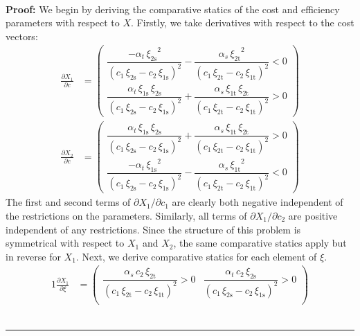 \documentclass[11pt,a4paper]{extarticle}
\newenvironment{proof}[1][Proof]{\noindent\textbf{#1:} }{\ \rule{0.5em}{0.5em}}
\begin{document}
\hfill \\
\begin{proof}
	We begin by deriving the comparative statics of the cost and efficiency parameters with respect to $X$.   Firstly, we take derivatives with respect to the cost vectors:
	\begin{align*}
	\frac{\partial X_1}{\partial c} &= 
	\begin{pmatrix}
	\dfrac{-\alpha _{t}\,{\xi _{\mathrm{2s}}}^2}{{\left(c_{1}\,\xi _{\mathrm{2s}}-c_{2}\,\xi _{\mathrm{1s}}\right)}^2}-\dfrac{\alpha _{s}\,{\xi _{\mathrm{2t}}}^2}{{\left(c_{1}\,\xi _{\mathrm{2t}}-c_{2}\,\xi _{\mathrm{1t}}\right)}^2}<0 \\
	\dfrac{\alpha _{t}\,\xi _{\mathrm{1s}}\,\xi _{\mathrm{2s}}}{{\left(c_{1}\,\xi _{\mathrm{2s}}-c_{2}\,\xi _{\mathrm{1s}}\right)}^2}+\dfrac{\alpha _{s}\,\xi _{\mathrm{1t}}\,\xi _{\mathrm{2t}}}{{\left(c_{1}\,\xi _{\mathrm{2t}}-c_{2}\,\xi _{\mathrm{1t}}\right)}^2}>0
	\end{pmatrix}\\
	\frac{\partial X_2}{\partial c} &= 
	\begin{pmatrix}
	\dfrac{\alpha _{t}\,\xi _{\mathrm{1s}}\,\xi _{\mathrm{2s}}}{{\left(c_{1}\,\xi _{\mathrm{2s}}-c_{2}\,\xi _{\mathrm{1s}}\right)}^2}+\dfrac{\alpha _{s}\,\xi _{\mathrm{1t}}\,\xi _{\mathrm{2t}}}{{\left(c_{1}\,\xi _{\mathrm{2t}}-c_{2}\,\xi _{\mathrm{1t}}\right)}^2}>0 \\
	\dfrac{-\alpha _{t}\,{\xi _{\mathrm{1s}}}^2}{{\left(c_{1}\,\xi _{\mathrm{2s}}-c_{2}\,\xi _{\mathrm{1s}}\right)}^2}-\dfrac{\alpha _{s}\,{\xi _{\mathrm{1t}}}^2}{{\left(c_{1}\,\xi _{\mathrm{2t}}-c_{2}\,\xi _{\mathrm{1t}}\right)}^2}<0
	\end{pmatrix}
	\end{align*}
	The first and second terms of $\partial X_1 / \partial c_1$ are clearly both negative independent of the restrictions on the parameters. Similarly, all terms of  $\partial X_1 / \partial c_2$ are positive independent of any restrictions. Since the structure of this problem is symmetrical with respect to $X_1$ and $X_2$, the same comparative statics apply but in reverse for $X_1$. Next, we derive comparative statics for each element of $\xi$.
	\begin{alignat*}{1}
	\frac{\partial X_1}{\partial \xi} &= 
	\begin{pmatrix}
	\dfrac{\alpha _{s}\,c_{2}\,\xi _{\mathrm{2t}}}{{\left(c_{1}\,\xi _{\mathrm{2t}}-c_{2}\,\xi _{\mathrm{1t}}\right)}^2}>0 & \dfrac{\alpha _{t}\,c_{2}\,\xi _{\mathrm{2s}}}{{\left(c_{1}\,\xi _{\mathrm{2s}}-c_{2}\,\xi _{\mathrm{1s}}\right)}^2}>0 \\

\end{pmatrix}
\end{alignat*}
\end{proof}
\end{document}
